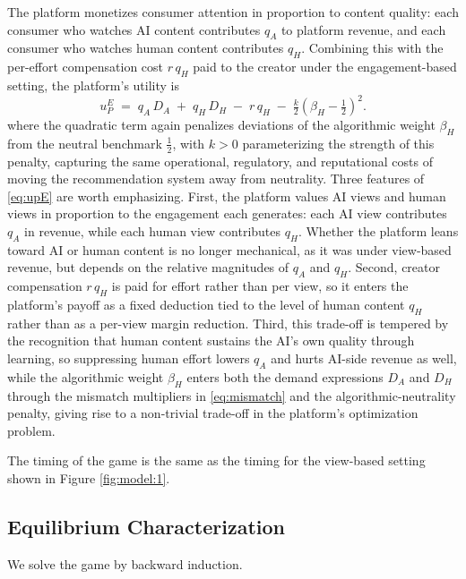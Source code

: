 The platform monetizes consumer
attention in proportion to content quality: each consumer who watches
AI content contributes $q_A$ to platform revenue, and each consumer
who watches human content contributes $q_H$. Combining this with the
per-effort compensation cost $r\,q_H$ paid to the creator under the engagement-based setting, the
platform's utility is
\begin{equation}\label{eq:upE}
u_P^{E}
\;=\; q_A\,D_A \;+\; q_H\,D_H \;-\; r\,q_H
\;-\; \tfrac{k}{2}\!\left(\beta_H - \tfrac{1}{2}\right)^{2}\!.
\end{equation}
where the quadratic term again penalizes deviations of the algorithmic 
weight $\beta_H$ from the neutral benchmark $\tfrac{1}{2}$, with 
$k > 0$ parameterizing the strength of this penalty, capturing the 
same operational, regulatory, and reputational costs of moving the 
recommendation system away from neutrality. Three features of 
\eqref{eq:upE} are worth emphasizing. First, the platform values 
AI views and human views in proportion to the engagement each 
generates: each AI view contributes $q_A$ in revenue, while each 
human view contributes $q_H$. Whether the platform leans toward AI 
or human content is no longer mechanical, as it was under view-based 
revenue, but depends on the relative magnitudes of $q_A$ and $q_H$. 
Second, creator compensation $r\,q_H$ is paid for effort rather than 
per view, so it enters the platform's payoff as a fixed deduction 
tied to the level of human content $q_H$ rather than as a per-view 
margin reduction. Third, this trade-off is tempered by the 
recognition that human content sustains the AI's own quality through 
learning, so suppressing human effort lowers $q_A$ and hurts 
AI-side revenue as well, while the algorithmic weight $\beta_H$ 
enters both the demand expressions $D_A$ and $D_H$ through the 
mismatch multipliers in \eqref{eq:mismatch} and the 
algorithmic-neutrality penalty, giving rise to a non-trivial 
trade-off in the platform's optimization problem.



The timing of the game is the same as the timing for the view-based setting shown in Figure \ref{fig:model:1}.

\subsection{Equilibrium Characterization}\label{ss:eb-equilibrium}

We solve the game by backward induction. 

